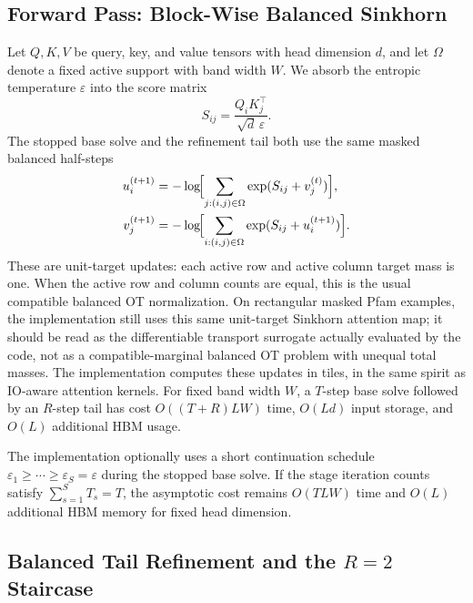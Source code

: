 \subsection{Forward Pass: Block-Wise Balanced Sinkhorn}

Let $Q,K,V$ be query, key, and value tensors with head dimension $d$, and let $\Omega$ denote a fixed active support with band width $W$. We absorb the entropic temperature $\varepsilon$ into the score matrix
\[
S_{ij} = \frac{Q_i K_j^\top}{\sqrt{d}\,\varepsilon}.
\]
The stopped base solve and the refinement tail both use the same masked balanced half-steps
\begin{align}
    u_i^{(t+1)} &= -\log\!\Bigl[\sum_{j:(i,j)\in\Omega} \exp(S_{ij} + v_j^{(t)})\Bigr], \\
    v_j^{(t+1)} &= -\log\!\Bigl[\sum_{i:(i,j)\in\Omega} \exp(S_{ij} + u_i^{(t+1)})\Bigr].
\end{align}
These are unit-target updates: each active row and active column target mass is one. When the active row and column counts are equal, this is the usual compatible balanced OT normalization. On rectangular masked Pfam examples, the implementation still uses this same unit-target Sinkhorn attention map; it should be read as the differentiable transport surrogate actually evaluated by the code, not as a compatible-marginal balanced OT problem with unequal total masses.
The implementation computes these updates in tiles, in the same spirit as IO-aware attention kernels. For fixed band width $W$, a $T$-step base solve followed by an $R$-step tail has cost $O((T+R)LW)$ time, $O(Ld)$ input storage, and $O(L)$ additional HBM usage.

\begin{remark}
The implementation optionally uses a short continuation schedule $\varepsilon_1 \ge \cdots \ge \varepsilon_S = \varepsilon$ during the stopped base solve. If the stage iteration counts satisfy $\sum_{s=1}^{S} T_s = T$, the asymptotic cost remains $O(TLW)$ time and $O(L)$ additional HBM memory for fixed head dimension.
\end{remark}

\subsection{Balanced Tail Refinement and the \texorpdfstring{$R=2$}{R=2} Staircase}

